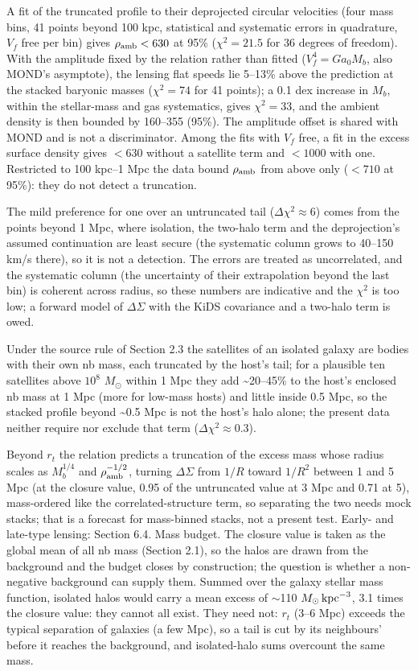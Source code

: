 \documentclass[
  10pt,
]{article}
\begin{document}
A fit of the truncated profile to their deprojected circular velocities (four mass bins, 41 points beyond 100 kpc, statistical and systematic errors in quadrature, $V_f$ free per bin) gives $\rho_{\rm amb}<630$ at 95\% ($\chi^2=21.5$ for 36 degrees of freedom). With the amplitude fixed by the relation rather than fitted ($V_f^4=Ga_0M_b$, also MOND's asymptote), the lensing flat speeds lie 5--13\% above the prediction at the stacked baryonic masses ($\chi^2=74$ for 41 points); a 0.1 dex increase in $M_b$, within the stellar-mass and gas systematics, gives $\chi^2=33$, and the ambient density is then bounded by 160--355 (95\%). The amplitude offset is shared with MOND and is not a discriminator. Among the fits with $V_f$ free, a fit in the excess surface density gives $<630$ without a satellite term and $<1000$ with one. Restricted to 100 kpc--1 Mpc the data bound $\rho_{\rm amb}$ from above only ($<710$ at 95\%): they do not detect a truncation.

The mild preference for one over an untruncated tail ($\Delta\chi^2\approx6$) comes from the points beyond 1 Mpc, where isolation, the two-halo term and the deprojection's assumed continuation are least secure (the systematic column grows to 40--150 km/s there), so it is not a detection. The errors are treated as uncorrelated, and the systematic column (the uncertainty of their extrapolation beyond the last bin) is coherent across radius, so these numbers are indicative and the $\chi^2$ is too low; a forward model of $\Delta\Sigma$ with the KiDS covariance and a two-halo term is owed.

Under the source rule of Section 2.3 the satellites of an isolated galaxy are bodies with their own nb mass, each truncated by the host's tail; for a plausible ten satellites above $10^{8}$ $M_\odot$ within 1 Mpc they add \textasciitilde{}20--45\% to the host's enclosed nb mass at 1 Mpc (more for low-mass hosts) and little inside 0.5 Mpc, so the stacked profile beyond \textasciitilde{}0.5 Mpc is not the host's halo alone; the present data neither require nor exclude that term ($\Delta\chi^2\approx0.3$).

Beyond $r_t$ the relation predicts a truncation of the excess mass whose radius scales as $M_b^{1/4}$ and $\rho_{\rm amb}^{-1/2}$, turning $\Delta\Sigma$ from $1/R$ toward $1/R^2$ between 1 and 5 Mpc (at the closure value, 0.95 of the untruncated value at 3 Mpc and 0.71 at 5), mass-ordered like the correlated-structure term, so separating the two needs mock stacks; that is a forecast for mass-binned stacks, not a present test. Early- and late-type lensing: Section 6.4. Mass budget. The closure value is taken as the global mean of all nb mass (Section 2.1), so the halos are drawn from the background and the budget closes by construction; the question is whether a non-negative background can supply them. Summed over the galaxy stellar mass function, isolated halos would carry a mean excess of $\sim$110 $M_\odot\,{\rm kpc}^{-3}$, 3.1 times the closure value: they cannot all exist. They need not: $r_t$ (3--6 Mpc) exceeds the typical separation of galaxies (a few Mpc), so a tail is cut by its neighbours' before it reaches the background, and isolated-halo sums overcount the same mass.
\end{document}
